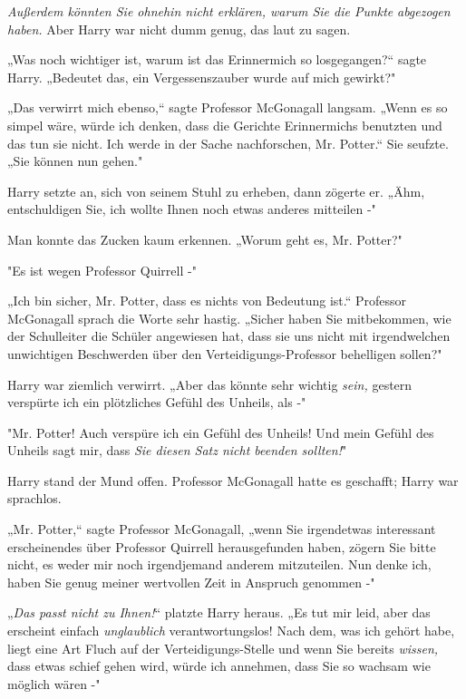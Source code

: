 {\emph{Außerdem könnten Sie ohnehin nicht erklären, warum Sie die Punkte} \emph{abgezogen haben.} Aber Harry war nicht dumm genug, das laut zu sagen.

„Was noch wichtiger ist, warum ist das Erinnermich so losgegangen?“ sagte Harry. „Bedeutet das, ein Vergessenszauber wurde auf mich gewirkt?"

„Das verwirrt mich ebenso,“ sagte Professor McGonagall langsam. „Wenn es so simpel wäre, würde ich denken, dass die Gerichte Erinnermichs benutzten und das tun sie nicht. Ich werde in der Sache nachforschen, Mr. Potter.“ Sie seufzte. „Sie können nun gehen."

Harry setzte an, sich von seinem Stuhl zu erheben, dann zögerte er. „Ähm, entschuldigen Sie, ich wollte Ihnen noch etwas anderes mitteilen -"

Man konnte das Zucken kaum erkennen. „Worum geht es, Mr. Potter?"

"Es ist wegen Professor Quirrell -"

„Ich bin sicher, Mr. Potter, dass es nichts von Bedeutung ist.“ Professor McGonagall sprach die Worte sehr hastig. „Sicher haben Sie mitbekommen, wie der Schulleiter die Schüler angewiesen hat, dass sie uns nicht mit irgendwelchen unwichtigen Beschwerden über den Verteidigungs-Professor behelligen sollen?"

Harry war ziemlich verwirrt. „Aber das könnte sehr wichtig \emph{sein,} gestern verspürte ich ein plötzliches Gefühl des Unheils, als -"

"Mr. Potter! Auch verspüre ich ein Gefühl des Unheils! Und mein Gefühl des Unheils sagt mir, dass \emph{Sie diesen Satz nicht beenden sollten!}"

Harry stand der Mund offen. Professor McGonagall hatte es geschafft; Harry war sprachlos.

„Mr. Potter,“ sagte Professor McGonagall, „wenn Sie irgendetwas interessant erscheinendes über Professor Quirrell herausgefunden haben, zögern Sie bitte nicht, es weder mir noch irgendjemand anderem mitzuteilen. Nun denke ich, haben Sie genug meiner wertvollen Zeit in Anspruch genommen -"

„\emph{Das passt nicht zu Ihnen!}“ platzte Harry heraus. „Es tut mir leid, aber das erscheint einfach \emph{unglaublich} verantwortungslos! Nach dem, was ich gehört habe, liegt eine Art Fluch auf der Verteidigungs-Stelle und wenn Sie bereits \emph{wissen,} dass etwas schief gehen wird, würde ich annehmen, dass Sie so wachsam wie möglich wären -"

}
